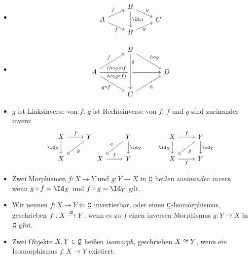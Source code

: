 \begin{ex}
	\begin{itemize}
		\item
			\[
				\begin{tikzcd}[row sep=tiny]
					& B \arrow{dr}{g} \arrow{dd}{\Id_B} & \\
					A \arrow{ur}{f} \arrow{dr}[below]{f} & & C \\
					& B \arrow{ur}[below]{g} &
				\end{tikzcd}
			\]
		\item
			\[
				\begin{tikzcd}[column sep=large]
					~& B \arrow{dr}{h\circ g} & \\
					A \arrow{ur}{f} \arrow{rr}[xshift=-7mm]{(h\circ g) \circ f}\arrow{rr}[xshift=-7mm,swap]{h\circ (g \circ f)} \arrow{dr}[swap]{g\circ f} & & D \\
					& C \arrow[leftarrow,crossing over]{uu}[yshift=5mm,swap]{g} \arrow{ur}[swap]{h} &
				\end{tikzcd}
			\]
		\item
			$g$ ist Linksinverse von $f$; $g$ ist Rechtsinverse von $f$; $f$ und $g$ sind zueinander invers:
			\[
				\begin{tikzcd}
					X \arrow{d}[swap]{\Id_X} \arrow{r}{f} & Y \arrow{dl}{g} \\
					X &
				\end{tikzcd}
				\!
				\begin{tikzcd}
					~& Y \arrow{d}{\Id_Y} \arrow{dl}[swap]{g} \\
					X \arrow{r}{f} & Y
				\end{tikzcd}
				\qquad
				\begin{tikzcd}
					X \arrow{r}{f} \arrow{d}[left]{\Id_X} & Y \arrow{d}{\Id_Y} \arrow{dl}{g} \\
					X \arrow{r}[below]{f} & Y
				\end{tikzcd}
			\]
	\end{itemize}
\end{ex}

\begin{df}
	\begin{itemize}
		\item
			Zwei Morphismen $f: X \to Y$ und $g: Y \to X$ in $\underline{\mathtt{C}}$ heißen \emph{zueinander invers}, wenn $g \circ f = \Id_X$ und $f \circ g = \Id_Y$ gilt.
		\item
			Wir nennen $f: X \to Y$ in $\underline{\mathtt{C}}$ invertierbar, oder einen $\underline{\mathtt{C}}$-Isomorphismus, geschrieben $f: X \xrightarrow{\cong} Y$, wenn es zu $f$ einen inversen Morphismus $g: Y \to X$ in $\underline{\mathtt{C}}$ gibt.
		\item
			Zwei Objekte $X, Y \in \underline{\mathtt{C}}$ heißen \emph{isomorph}, geschrieben $X \cong Y$, wenn ein Isomorphismus $f: X \to Y$ existiert.
	\end{itemize}
\end{df}

